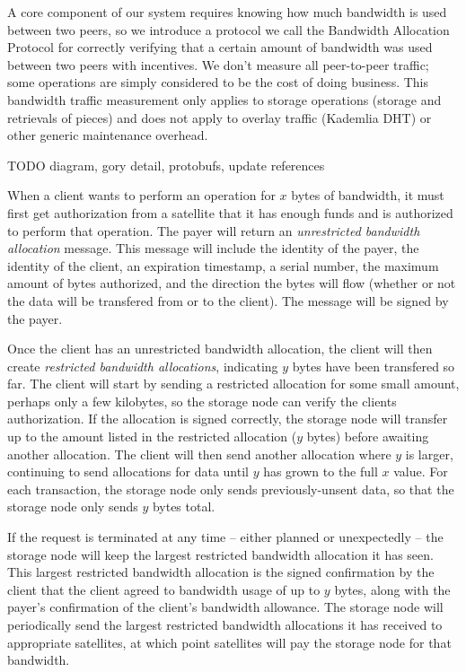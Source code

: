 \documentclass[a4paper,10pt]{article} \usepackage[utf8]{inputenc}
\newcommand{\todo}[1]{{\color{red} TODO #1 }}
\begin{document}
A core component of our system requires knowing how much bandwidth is used
between two peers, so we introduce a protocol we call the Bandwidth Allocation
Protocol for correctly verifying that a certain amount of bandwidth was used
between two peers with incentives.
We don't measure all peer-to-peer traffic;
some operations are simply considered to be
the cost of doing business. This bandwidth traffic measurement only applies
to storage operations (storage and retrievals of pieces) and does not
apply to overlay traffic (Kademlia DHT) or other generic maintenance overhead.

\todo{diagram, gory detail, protobufs, update references}

When a client wants to perform an operation for $x$ bytes of bandwidth, it must
first get authorization from a satellite
that it has enough funds and is authorized to perform that operation.
The payer will return an {\em unrestricted
bandwidth allocation} message. This message will include the identity of the
payer, the identity of the client, an expiration timestamp, a serial number,
the maximum amount of bytes authorized, and the direction the bytes will flow
(whether or not the data will be transfered from or to the client).
The message will be signed by the payer.


Once the client has an unrestricted bandwidth allocation, the client will then
create {\em restricted bandwidth allocations},
indicating $y$ bytes have been transfered so far. The client
will start by sending a restricted allocation for some small amount,
perhaps only a few kilobytes,
so the storage node can verify the clients authorization.
If the allocation is signed correctly, the storage node will
transfer up to the amount listed in the restricted allocation ($y$ bytes) before
awaiting another allocation. The client will then send another allocation where
$y$ is larger, continuing to send allocations for data until $y$ has grown to
the full $x$ value.
For each transaction, the storage node only sends previously-unsent data,
so that the storage node only sends $y$ bytes total.

If the request is terminated at any time --
either planned or unexpectedly --
the storage node will keep the largest restricted bandwidth allocation it has
seen.
This largest restricted bandwidth allocation is the signed confirmation
by the client that the client agreed to bandwidth usage of up to $y$
bytes, along with the payer's confirmation of the client's bandwidth allowance.
The storage node will periodically send the largest restricted bandwidth
allocations it has received to appropriate satellites, at which point
satellites will pay the storage node for that bandwidth.
\end{document}
